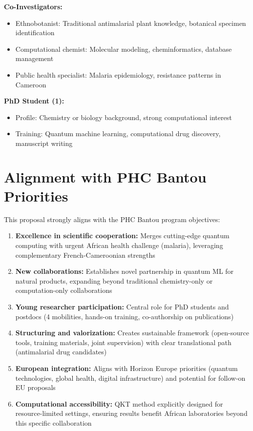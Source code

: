 \documentclass[11pt,a4paper]{article}
\begin{document}
\textbf{Co-Investigators:}
\begin{itemize}
    \item Ethnobotanist: Traditional antimalarial plant knowledge, botanical specimen identification
    \item Computational chemist: Molecular modeling, cheminformatics, database management
    \item Public health specialist: Malaria epidemiology, resistance patterns in Cameroon
\end{itemize}

\textbf{PhD Student (1):}
\begin{itemize}
    \item Profile: Chemistry or biology background, strong computational interest
    \item Training: Quantum machine learning, computational drug discovery, manuscript writing
\end{itemize}

\section{Alignment with PHC Bantou Priorities}

This proposal strongly aligns with the PHC Bantou program objectives:

\begin{enumerate}
    \item \textbf{Excellence in scientific cooperation:} Merges cutting-edge quantum computing with urgent African health challenge (malaria), leveraging complementary French-Cameroonian strengths
    
    \item \textbf{New collaborations:} Establishes novel partnership in quantum ML for natural products, expanding beyond traditional chemistry-only or computation-only collaborations
    
    \item \textbf{Young researcher participation:} Central role for PhD students and postdocs (4 mobilities, hands-on training, co-authorship on publications)
    
    \item \textbf{Structuring and valorization:} Creates sustainable framework (open-source tools, training materials, joint supervision) with clear translational path (antimalarial drug candidates)
    
    \item \textbf{European integration:} Aligns with Horizon Europe priorities (quantum technologies, global health, digital infrastructure) and potential for follow-on EU proposals
    
    \item \textbf{Computational accessibility:} QKT method explicitly designed for resource-limited settings, ensuring results benefit African laboratories beyond this specific collaboration
\end{enumerate}
\end{document}
